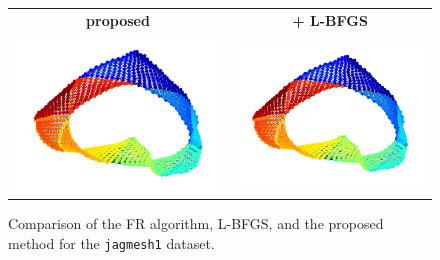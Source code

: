\documentclass[dvipdfmx,journal]{IEEEtran}
\begin{document}
\begin{figure}[t]
\begin{tabular}{cc}
    \large{\textbf{proposed}}                                    & \large{\textbf{+ L-BFGS}} \\
    \begin{minipage}{0.45\columnwidth}
      \centering
      \includegraphics[width=\columnwidth]{jagmesh1_LBFGS_50iter.png}
    \end{minipage}
                                                                 &
    \begin{minipage}{0.45\columnwidth}
      \centering
      \includegraphics[width=\columnwidth]{jagmesh1_LBFGS_50iter.png}
    \end{minipage}
  \end{tabular}
  \caption{
    Comparison of the FR algorithm, L-BFGS, and the proposed method
    for the \texttt{jagmesh1} dataset.}
  \label{table:four_images}
\end{figure}
\end{document}
